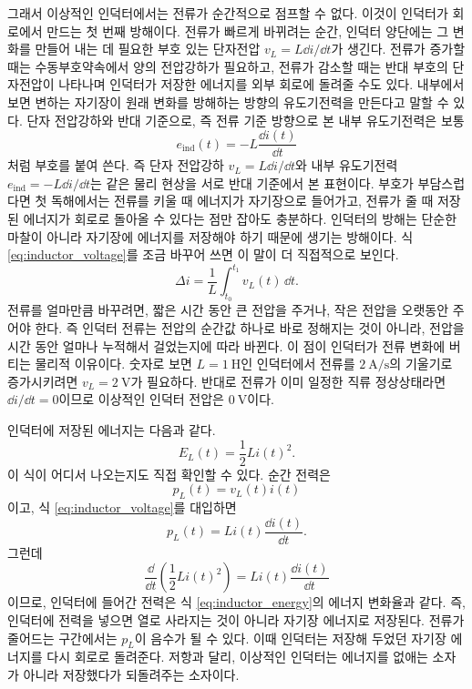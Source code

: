 그래서 이상적인 인덕터에서는 전류가 순간적으로 점프할 수 없다.
이것이 인덕터가 회로에서 만드는 첫 번째 방해이다.
전류가 빠르게 바뀌려는 순간, 인덕터 양단에는 그 변화를 만들어 내는 데 필요한 부호 있는 단자전압 $v_L=L\dd i/\dd t$가 생긴다.
전류가 증가할 때는 수동부호약속에서 양의 전압강하가 필요하고, 전류가 감소할 때는 반대 부호의 단자전압이 나타나며 인덕터가 저장한 에너지를 외부 회로에 돌려줄 수도 있다.
내부에서 보면 변하는 자기장이 원래 변화를 방해하는 방향의 유도기전력을 만든다고 말할 수 있다.
단자 전압강하와 반대 기준으로, 즉 전류 기준 방향으로 본 내부 유도기전력은 보통
\begin{equation}
  e_{\mathrm{ind}}(t)=-L\frac{\dd i(t)}{\dd t}
\end{equation}
처럼 부호를 붙여 쓴다.
즉 단자 전압강하 $v_L=L\dd i/\dd t$와 내부 유도기전력 $e_{\mathrm{ind}}=-L\dd i/\dd t$는 같은 물리 현상을 서로 반대 기준에서 본 표현이다.
부호가 부담스럽다면 첫 독해에서는 전류를 키울 때 에너지가 자기장으로 들어가고, 전류가 줄 때 저장된 에너지가 회로로 돌아올 수 있다는 점만 잡아도 충분하다.
인덕터의 방해는 단순한 마찰이 아니라 자기장에 에너지를 저장해야 하기 때문에 생기는 방해이다.
식 \eqref{eq:inductor_voltage}를 조금 바꾸어 쓰면 이 말이 더 직접적으로 보인다.
\begin{equation}
  \Delta i
  =
  \frac{1}{L}\int_{t_0}^{t_1} v_L(t)\,\dd t.
\end{equation}
전류를 얼마만큼 바꾸려면, 짧은 시간 동안 큰 전압을 주거나, 작은 전압을 오랫동안 주어야 한다.
즉 인덕터 전류는 전압의 순간값 하나로 바로 정해지는 것이 아니라, 전압을 시간 동안 얼마나 누적해서 걸었는지에 따라 바뀐다.
이 점이 인덕터가 전류 변화에 버티는 물리적 이유이다.
숫자로 보면 $L=1~\mathrm{H}$인 인덕터에서 전류를 $2~\mathrm{A/s}$의 기울기로 증가시키려면 $v_L=2~\mathrm{V}$가 필요하다.
반대로 전류가 이미 일정한 직류 정상상태라면 $\dd i/\dd t=0$이므로 이상적인 인덕터 전압은 $0~\mathrm{V}$이다.

인덕터에 저장된 에너지는 다음과 같다.
\begin{equation}
  E_L(t)=\frac{1}{2}L i(t)^2.
  \label{eq:inductor_energy}
\end{equation}
이 식이 어디서 나오는지도 직접 확인할 수 있다.
순간 전력은
\begin{equation}
  p_L(t)=v_L(t)i(t)
\end{equation}
이고, 식 \eqref{eq:inductor_voltage}를 대입하면
\begin{equation}
  p_L(t)=L i(t)\frac{\dd i(t)}{\dd t}.
\end{equation}
그런데
\begin{equation}
  \frac{\dd}{\dd t}\left(\frac{1}{2}L i(t)^2\right)
  =
  L i(t)\frac{\dd i(t)}{\dd t}
\end{equation}
이므로, 인덕터에 들어간 전력은 식 \eqref{eq:inductor_energy}의 에너지 변화율과 같다.
즉, 인덕터에 전력을 넣으면 열로 사라지는 것이 아니라 자기장 에너지로 저장된다.
전류가 줄어드는 구간에서는 $p_L$이 음수가 될 수 있다.
이때 인덕터는 저장해 두었던 자기장 에너지를 다시 회로로 돌려준다.
저항과 달리, 이상적인 인덕터는 에너지를 없애는 소자가 아니라 저장했다가 되돌려주는 소자이다.

